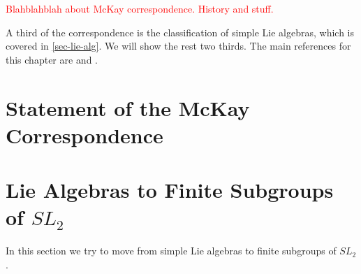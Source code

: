 \documentclass[12pt]{report}
\theoremstyle{remark}
\theoremstyle{definition}
\begin{document}
    \textcolor{red}{Blahblahblah about McKay correspondence. History and stuff.}
    
    
    A third of the correspondence is the classification of simple Lie algebras, which is covered in \autoref{sec-lie-alg}. We will show the rest two thirds. The main references for this chapter are \cite{dolgachev_2009_mckay} and \cite{kirillov_2016_quiver}.
    \section{Statement of the McKay Correspondence}

    \section{Lie Algebras to Finite Subgroups of $SL_2$}
    In this section we try to move from simple Lie algebras to finite subgroups of $SL_2$.
\end{document}

